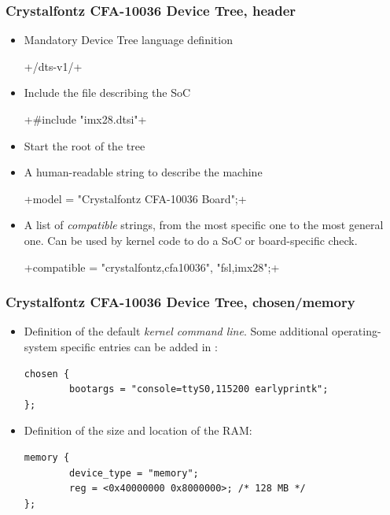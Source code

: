 \begin{frame}[fragile]
  \frametitle{Crystalfontz CFA-10036 Device Tree, header}
  \begin{itemize}
  \item Mandatory Device Tree language definition\\
    \begin{block}{} +/dts-v1/+ \end{block}
  \item Include the  file describing the SoC\\
    \begin{block}{}
      +#include "imx28.dtsi"+
    \end{block}
  \item Start the root of the tree\\
    \begin{block}{} +/ {+ \end{block}
  \item A human-readable string to describe the machine\\
    \begin{block}{}
      +model = "Crystalfontz CFA-10036 Board";+
    \end{block}
  \item A list of {\em compatible} strings, from the most specific one
    to the most general one. Can be used by kernel code to do a SoC or
    board-specific check.\\
    \begin{block}{}
      +compatible = "crystalfontz,cfa10036", "fsl,imx28";+
    \end{block}
  \end{itemize}
\end{frame}

\begin{frame}[fragile]
  \frametitle{Crystalfontz CFA-10036 Device Tree, chosen/memory}
  \begin{itemize}
  \item Definition of the default {\em kernel command line}. Some
    additional operating-system specific entries can be added in
    :
    \begin{block}{}
    \begin{verbatim}
chosen {
        bootargs = "console=ttyS0,115200 earlyprintk";
};
\end{verbatim}
\end{block}
\item Definition of the size and location of the RAM:
  \begin{block}{}
    \begin{verbatim}
memory {
        device_type = "memory";
        reg = <0x40000000 0x8000000>; /* 128 MB */
};
      \end{verbatim}
    \end{block}
  \end{itemize}
\end{frame}

